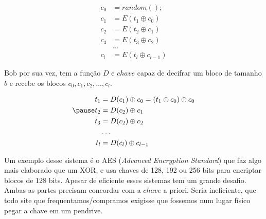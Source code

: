 \begin{frame}{}{}
\begin{align}
c_0 & = random();\\
c_1 & = E(t_1 \oplus c_0)\\
c_2 & = E(t_2 \oplus c_1)\\
c_3 & = E(t_3 \oplus c_2)\\
& \ldots \\
c_l & = E(t_l \oplus c_{l-1})
\end{align}
\end{frame}



\begin{frame}{}{}
\begin{itemize}
\pitem Bob por sua vez, tem a função $D$ e $chave$ capaz de decifrar um bloco de tamanho $b$ e recebe os blocos $c_0, c_1, c_2, \ldots, c_l$.
\end{itemize}
\begin{align}
t_1 &= D(c_1) \oplus c_0 = (t_1 \oplus c_0) \oplus c_0\\\ppause
t_2 &= D(c_2) \oplus c_1 \\
t_3 &= D(c_2) \oplus c_2 \\
& \ldots \\
t_l &= D(c_l) \oplus c_{l-1}
\end{align}
\end{frame}



\begin{frame}{}{}
\begin{itemize}
\pitem Um exemplo desse sistema é o AES ({\it Advanced Encryption Standard}) que faz algo mais elaborado que um XOR, e usa chaves de 128, 192 ou 256 bits para encriptar blocos de 128 bits.
\pitem Apesar de eficiente esses sistemas tem um grande desafio. Ambas as partes precisam concordar com a $chave$ a priori.
\pitem Seria ineficiente, que todo site que frequentamos/compramos exigisse que fossemos num lugar físico pegar a chave em um pendrive.
\end{itemize}
\end{frame}

